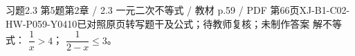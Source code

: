 \par\noindent\begin{minipage}{\linewidth}
\begin{bankitem}{习题2.3 第5题}{第2章 / 2.3 一元二次不等式 / 教材 p.59 / PDF 第66页}{XJ-B1-C02-HW-P059-Y0410}{已对照原页转写题干及公式；待教师复核；未制作答案}
解不等式：
$\dfrac1x>4$；
$\dfrac1{2-x}\le3$。
\end{bankitem}
\end{minipage}\par\medskip

